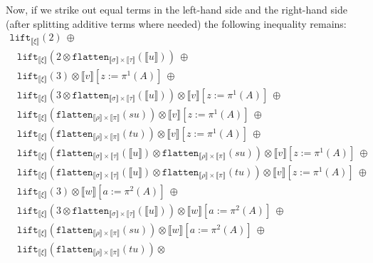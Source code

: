 \documentclass[a4paper,UKenglish,cleveref,autoref,numberwithinsect]{lipics-v2019}
\theoremstyle{definition}
\newcommand{\flatten}{\mathtt{flatten}}
\newcommand{\lift}{\mathtt{lift}}
\newcommand{\typeinterpret}[1]{\llbracket #1 \rrbracket}
\newcommand{\interpret}[1]{\llbracket #1 \rrbracket}
\begin{document}
\begin{itemize}
  Now, if we strike out equal terms in the left-hand side and the
  right-hand side (after splitting additive terms where needed)
  the following inequality remains:
  \[
  \begin{array}{l}
  \lift_{\typeinterpret{\xi}}(2)\ \oplus \\
  \phantom{A}
     \lift_{\typeinterpret{\xi}}(2 \otimes
      \flatten_{\typeinterpret{\sigma} \times \typeinterpret{\tau}}(
      \interpret{u}))\ \oplus \\
  \phantom{A}
    \lift_{\typeinterpret{\xi}}(3) \otimes \interpret{v}[z:=\pi^1(A)]
    \ \oplus \\
  \phantom{A}
    \lift_{\typeinterpret{\xi}}(3 \otimes
    \flatten_{\typeinterpret{\sigma} \times \typeinterpret{\tau}}(
    \interpret{u})) \otimes
     \interpret{v}[z:=\pi^1(A)]
    \ \oplus \\
  \phantom{A}
    \lift_{\typeinterpret{\xi}}(\flatten_{\typeinterpret{\rho} \times
    \typeinterpret{\pi}}(su)) \otimes
     \interpret{v}[z:=\pi^1(A)]
    \ \oplus\\
  \phantom{A}
    \lift_{\typeinterpret{\xi}}(\flatten_{\typeinterpret{\rho} \times
    \typeinterpret{\pi}}(tu)) \otimes
     \interpret{v}[z:=\pi^1(A)]
    \ \oplus \\
  \phantom{A}
    \lift_{\typeinterpret{\xi}}(\flatten_{\typeinterpret{\sigma} \times
    \typeinterpret{\tau}}(\interpret{u}) \otimes
    \flatten_{\typeinterpret{\rho} \times \typeinterpret{\pi}}(su))
    \otimes
     \interpret{v}[z:=\pi^1(A)]
    \ \oplus \\
  \phantom{A}
    \lift_{\typeinterpret{\xi}}(\flatten_{\typeinterpret{\sigma} \times
    \typeinterpret{\tau}}(\interpret{u}) \otimes
    \flatten_{\typeinterpret{\rho} \times \typeinterpret{\pi}}(tu))
    \otimes
     \interpret{v}[z:=\pi^1(A)]
    \ \oplus \\
  \phantom{A}
    \lift_{\typeinterpret{\xi}}(3) \otimes \interpret{w}[a:=\pi^2(A)]
    \ \oplus \\
  \phantom{A}
    \lift_{\typeinterpret{\xi}}(3 \otimes
    \flatten_{\typeinterpret{\sigma} \times \typeinterpret{\tau}}(
    \interpret{u})) \otimes
    \interpret{w}[a:=\pi^2(A)]
    \ \oplus \\
  \phantom{A}
    \lift_{\typeinterpret{\xi}}(\flatten_{\typeinterpret{\rho} \times
    \typeinterpret{\pi}}(su)) \otimes
    \interpret{w}[a:=\pi^2(A)]
    \ \oplus\\
  \phantom{A}
    \lift_{\typeinterpret{\xi}}(\flatten_{\typeinterpret{\rho} \times
    \typeinterpret{\pi}}(tu)) \otimes

\end{array}\]
\end{itemize}
\end{document}
